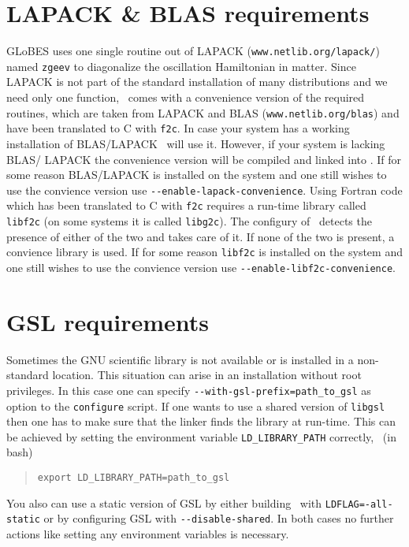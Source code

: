 \begin{appendix}
\section*{LAPACK \& BLAS requirements}


GLoBES uses one single routine out of LAPACK (\verb^www.netlib.org/lapack/^) named
\verb^zgeev^ to diagonalize the oscillation Hamiltonian in matter. Since LAPACK
is not part of the standard installation of many distributions and we need
only one function, \GLOBES\ comes with a convenience version of the required
routines, which are taken from LAPACK and BLAS (\verb^www.netlib.org/blas^) and have
been translated to C with \verb^f2c^. In case your system has a working installation
of BLAS/LAPACK \GLOBES\ will use it. However, if your system is lacking BLAS/
LAPACK the convenience version will be compiled and linked into \GLOBES. If
for some reason BLAS/LAPACK is installed on the system and one still wishes
to use the convience version use \verb^--enable-lapack-convenience^. Using Fortran
code which has been translated to C with \verb^f2c^ requires a run-time library
called \verb^libf2c^ (on some systems it is called \verb^libg2c^). The configury of 
\GLOBES\ detects the presence of either of the two and takes care of it.
If none of the two is present, a convience library is used. If
for some reason \verb^libf2c^ is installed on the system and one still wishes
to use the convience version use \verb^--enable-libf2c-convenience^.

\section*{GSL requirements}


Sometimes the GNU scientific library is not available or is installed in a non-standard
location. This situation can arise in an installation without root privileges. In this 
case one can specify \verb^--with-gsl-prefix=path_to_gsl^ as option to the \verb^configure^ script.
If one wants to use a shared version of \verb^libgsl^ then one has to make sure that the
linker finds the library at run-time. This can be achieved by setting the environment variable
\verb^LD_LIBRARY_PATH^ correctly, \ie\ (in bash)
\begin{quote} 
\verb^export LD_LIBRARY_PATH=path_to_gsl^
\end{quote}
You also can use a static version of GSL by either building \GLOBES\ with \verb^LDFLAG=-all-static^
or by configuring GSL with \verb^--disable-shared^. In both cases no further actions like setting
any environment variables is necessary.


\end{appendix}
